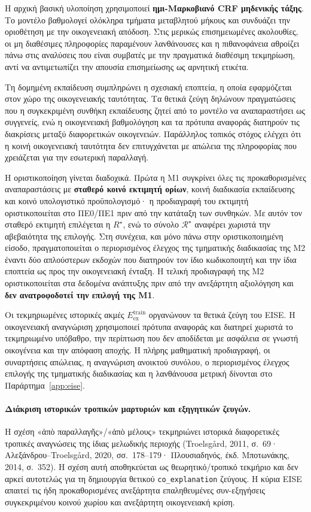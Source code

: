 \documentclass[11pt,a4paper]{article}
\begin{document}
Η αρχική βασική υλοποίηση χρησιμοποιεί \textbf{ημι-Μαρκοβιανό CRF μηδενικής τάξης}. Το μοντέλο βαθμολογεί ολόκληρα τμήματα μεταβλητού μήκους και συνδυάζει την οριοθέτηση με την οικογενειακή απόδοση. Στις μερικώς επισημειωμένες ακολουθίες, οι μη διαθέσιμες πληροφορίες παραμένουν λανθάνουσες και η πιθανοφάνεια αθροίζει πάνω στις αναλύσεις που είναι συμβατές με την πραγματικά διαθέσιμη τεκμηρίωση, αντί να αντιμετωπίζει την απουσία επισημείωσης ως αρνητική ετικέτα.

Τη δομημένη εκπαίδευση συμπληρώνει η σχεσιακή εποπτεία, η οποία εφαρμόζεται στον χώρο της οικογενειακής ταυτότητας. Τα θετικά ζεύγη δηλώνουν πραγματώσεις που η συγκεκριμένη συνθήκη εκπαίδευσης ζητεί από το μοντέλο να αναπαραστήσει ως συγγενείς, ενώ η οικογενειακή βαθμολόγηση και τα πρότυπα αναφοράς διατηρούν τις διακρίσεις μεταξύ διαφορετικών οικογενειών. Παράλληλος τοπικός στόχος ελέγχει ότι η κοινή οικογενειακή ταυτότητα δεν επιτυγχάνεται με απώλεια της πληροφορίας που χρειάζεται για την εσωτερική παραλλαγή.

Η οριστικοποίηση γίνεται διαδοχικά. Πρώτα η M1 συγκρίνει όλες τις προκαθορισμένες αναπαραστάσεις με \textbf{σταθερό κοινό εκτιμητή ορίων}, κοινή διαδικασία εκπαίδευσης και κοινό υπολογιστικό προϋπολογισμό· η προδιαγραφή του εκτιμητή οριστικοποιείται στο ΠΕ0/ΠΕ1 πριν από την κατάταξη των συνθηκών. Με αυτόν τον σταθερό εκτιμητή επιλέγεται η $R^\star$, ενώ το σύνολο $\mathcal R^\star$ αναφέρει χωριστά την αβεβαιότητα της επιλογής. Στη συνέχεια, και μόνο πάνω στην οριστικοποιημένη είσοδο, πραγματοποιείται ο περιορισμένος έλεγχος της τμηματικής διαδικασίας της M2 έναντι δύο απλούστερων εκδοχών που διατηρούν τον ίδιο κωδικοποιητή και την ίδια εποπτεία ως προς την οικογενειακή ένταξη. Η τελική προδιαγραφή της M2 οριστικοποιείται στα δεδομένα ανάπτυξης πριν από την ανεξάρτητη αξιολόγηση και \textbf{δεν ανατροφοδοτεί την επιλογή της M1}.

Οι τεκμηριωμένες ιστορικές ακμές $E_{\mathrm{ex}}^{\mathrm{train}}$ οργανώνουν τα θετικά ζεύγη του EISE. Η οικογενειακή αναγνώριση χρησιμοποιεί πρότυπα αναφοράς και διατηρεί χωριστά το τεκμηριωμένο υπόβαθρο, την περίπτωση που δεν αποδίδεται με ασφάλεια σε γνωστή οικογένεια και την απόφαση αποχής. Η πλήρης μαθηματική προδιαγραφή, οι συναρτήσεις απώλειας, η αναγνώριση ανοικτού συνόλου, ο περιορισμένος έλεγχος επιλογής της τμηματικής διαδικασίας και η λανθάνουσα μετρική δίνονται στο Παράρτημα~\ref{app:eise}.

\paragraph{Διάκριση ιστορικών τροπικών μαρτυριών και εξηγητικών ζευγών.} Η σχέση «ἀπὸ παραλλαγῆς»/«ἀπὸ μέλους» τεκμηριώνει ιστορικά διαφορετικές τροπικές αναγνώσεις της ίδιας μελωδικής περιοχής (Troelsgård, 2011, σ.~69· Αλεξάνδρου--Troelsgård, 2020, σσ.~178--179· Πλουσιαδηνός, έκδ. Μποτωνάκης, 2014, σ.~352). Η σχέση αυτή αποθηκεύεται ως θεωρητικό/τροπικό τεκμήριο και δεν αρκεί αυτοτελώς για τη δημιουργία θετικού \texttt{co\_explanation} ζεύγους. Η κύρια EISE απαιτεί τις ήδη προκαθορισμένες ανεξάρτητα επαληθευμένες συν-εξηγήσεις συγκεκριμένου κοινού χωρίου και ανεξάρτητη οικογενειακή κρίση.
\end{document}
